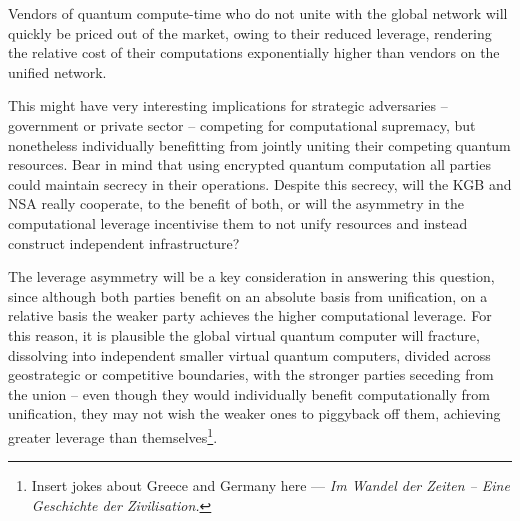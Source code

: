 Vendors of quantum compute-time who do not unite with the global network will quickly be priced out of the market, owing to their reduced leverage, rendering the relative cost of their computations exponentially higher than vendors on the unified network. 

This might have very interesting implications for strategic adversaries -- government or private sector -- competing for computational supremacy, but nonetheless individually benefitting from jointly uniting their competing quantum resources. Bear in mind that using encrypted quantum computation all parties could maintain secrecy in their operations. Despite this secrecy, will the KGB and NSA really cooperate, to the benefit of both, or will the asymmetry in the computational leverage incentivise them to not unify resources and instead construct independent infrastructure?

The leverage asymmetry will be a key consideration in answering this question, since although both parties benefit on an absolute basis from unification, on a relative basis the weaker party achieves the higher computational leverage. For this reason, it is plausible the global virtual quantum computer will fracture, dissolving into independent smaller virtual quantum computers, divided across geostrategic or competitive boundaries, with the stronger parties seceding from the union -- even though they would individually benefit computationally from unification, they may not wish the weaker ones to piggyback off them, achieving greater leverage than themselves\footnote{Insert jokes about Greece and Germany here --- \textit{Im Wandel der Zeiten -- Eine Geschichte der Zivilisation.}}.